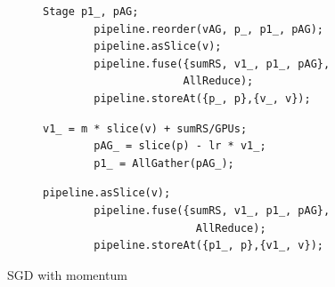 \begin{figure}[t]
\begin{subfigure}{0.45\textwidth}
\begin{lstlisting}[language=DSL]     
        Stage p1_, pAG;
        pipeline.reorder(vAG, p_, p1_, pAG); 
        pipeline.asSlice(v); 
        pipeline.fuse({sumRS, v1_, p1_, pAG}, 
                      AllReduce); 
        pipeline.storeAt({p_, p},{v_, v});
\end{lstlisting}
\caption{}
\end{subfigure}
\begin{subfigure}{0.45\textwidth}
\begin{lstlisting}[language=DSL]     
        v1_ = m * slice(v) + sumRS/GPUs; 
        pAG_ = slice(p) - lr * v1_; 
        p1_ = AllGather(pAG_);
\end{lstlisting}
\caption{}
\end{subfigure}

\begin{subfigure}{0.45\textwidth}
\begin{lstlisting}[language=DSL]     
        pipeline.asSlice(v); 
        pipeline.fuse({sumRS, v1_, p1_, pAG}, 
                        AllReduce); 
        pipeline.storeAt({p1_, p},{v1_, v});
\end{lstlisting}
\caption{}
\end{subfigure}
\caption{SGD with momentum}
\end{figure}



